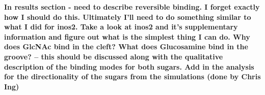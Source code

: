 \textbf{In results section - need to describe reversible binding. I forget exactly how I should do this.  Ultimately I'll need to do something similar to what I did for inos2. Take a look at inos2 and it's supplementary information and figure out what is the simplest thing I can do.
Why does GlcNAc bind in the cleft?  What does Glucosamine bind in the groove? -- this should be discussed along with the qualitative description of the binding modes for both sugars. Add in the analysis for the directionality of the sugars from the simulations (done by Chris Ing)}





